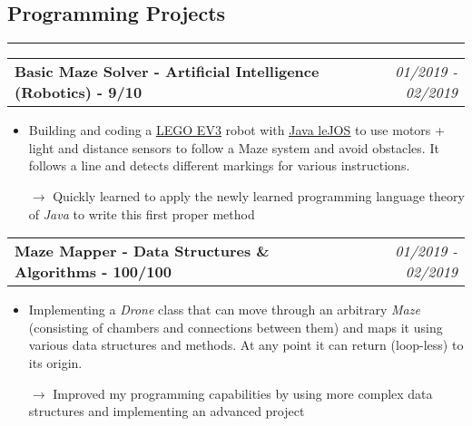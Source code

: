 \documentclass[10pt,letterpaper]{article}
\makeatletter
\newcommand{\headerrow}[2]
{\begin{tabular*}{\linewidth}{l@{\extracolsep{\fill}}r}
	#1 &
	#2 \\
\end{tabular*}}
\makeatother
\begin{document}
\subsection*{Programming Projects}
\hrule
\vspace{0.4em}

\noindent
\headerrow{\textbf{Basic Maze Solver - Artificial Intelligence (Robotics) - 9/10}}{\emph{01/2019 - 02/2019}}
\vspace{-1.6em}
\begin{itemize}
    \setlength\itemsep{0em}
    \item Building and coding a \href{https://www.lego.com/en-us/mindstorms/about-ev3}{\underline{LEGO EV3}} robot with \href{http://www.lejos.org}{\underline{Java leJOS}} to use motors + light and distance sensors to follow a Maze system and avoid obstacles. It follows a line and detects different markings for various instructions.
    \item[$\rightarrow$] Quickly learned to apply the newly learned programming language theory of \emph{Java} to write this first proper method
\end{itemize}

\noindent
\headerrow{\textbf{Maze Mapper - Data Structures \& Algorithms - 100/100}}{\emph{01/2019 - 02/2019}}
\vspace{-1.6em}
\begin{itemize}
    \setlength\itemsep{0em}
    \item Implementing a \emph{Drone} class that can move through an arbitrary \emph{Maze} (consisting of chambers and connections between them) and maps it using various data structures and methods. At any point it can return (loop-less) to its origin.
    \item[$\rightarrow$] Improved my programming capabilities by using more complex data structures and implementing an advanced project
\end{itemize}
\vspace{0.4em}
\end{document}
